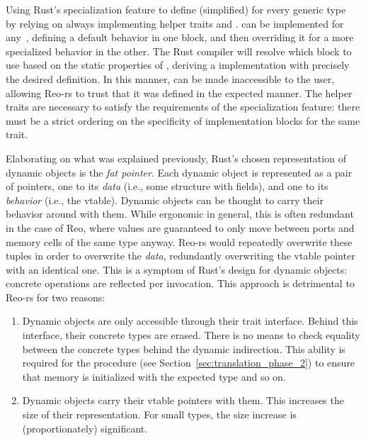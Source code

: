 \begin{listing}[ht]
	\centering
	\inputminted{rust}{specialization.rs}
	\caption[Rust specialization to implement traits.]{Using Rust's specialization feature to define  (simplified) for every generic type~ by relying on  always implementing helper traits  and .  can be implemented for any~, defining a default behavior in one block, and then overriding it for a more specialized behavior in the other. The Rust compiler will resolve which block to use based on the static properties of , deriving a  implementation with precisely the desired definition. In this manner,  can be made inaccessible to the user, allowing Reo-rs to trust that it was defined in the expected manner. The helper traits are necessary to satisfy the requirements of the specialization feature: there must be a strict ordering on the specificity of implementation blocks for the same trait.}
	\label{listing:specialization}
\end{listing}

Elaborating on what was explained previously, Rust's chosen representation of dynamic objects is the \textit{fat pointer}. Each dynamic object is represented as a pair of pointers, one to its \textit{data} (i.e., some structure with fields), and one to its \textit{behavior} (i.e., the vtable). Dynamic objects can be thought to carry their behavior around with them. While ergonomic in general, this is often redundant in the case of Reo, where values are guaranteed to only move between ports and memory cells of the same type anyway. Reo-rs would repeatedly overwrite these tuples in order to overwrite the \textit{data}, redundantly overwriting the vtable pointer with an identical one. This is a symptom of Rust's design for dynamic objects: concrete operations are reflected per invocation. This approach is detrimental to Reo-rs for two reasons:
\begin{enumerate}
	\item Dynamic objects are only accessible through their trait interface. Behind this interface, their concrete types are erased. There is no means to check equality between the concrete types behind the dynamic indirection. This ability is required for the  procedure (see Section~\ref{sec:translation_phase_2}) to ensure that memory is initialized with the expected type and so on.
	
	\item Dynamic objects carry their vtable pointers with them. This increases the size of their representation. For small types, the size increase is (proportionately) significant.
\end{enumerate}

